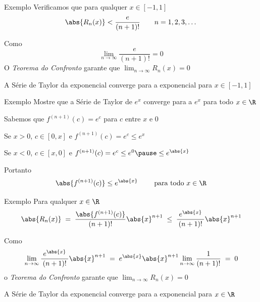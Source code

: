 \documentclass[fleqn,utf8,aspectratio=169,12pt]{beamer}
\begin{document}
\begin{frame}{Exemplo \theexemplo}
  Verificamos que para qualquer \(x\in[-1, 1]\)
  \[
    \abs{R_n(x)} < \frac{\;e\;}{(n+1)!}
    \qquad
    n = 1, 2, 3, \dots
  \]

  \pause
  Como
  \[
    \lim_{n\to\infty} \frac{\;e\;}{(n+1)!} = 0
  \]
  \pause
  O \emph{Teorema do Confronto} garante que
  \(
    \lim_{n\to\infty} R_n(x) = 0
  \)

  \pause
  A Série de Taylor da exponencial converge para a exponencial para \(x\in[-1, 1]\)
\end{frame}

\addtocounter{exemplo}{1}
\begin{frame}{Exemplo \theexemplo}
  Mostre que a Série de Taylor de \(e^x\) converge para a \(e^x\) para todo
  \(x\in\R\)

  \pause
  \vspace{\baselineskip}
  Sabemos que
  \(
    f^{(n+1)}(c) = e^c
  \)
  para \(c\) entre \(x\) e \(0\)

  \pause
  \vspace{\baselineskip}
  Se \(x>0\), \(c\in[0, x]\)
  \pause
  e \;
  \(
    f^{(n+1)}(c) = e^c \leq e^x
  \)

  \pause
  \vspace{0.5\baselineskip}
  Se \(x<0\), \(c\in[x, 0]\)
  \pause
  e \;
  \(
    f^{(n+1)}(c) = e^c \leq e^0
    \pause
    \leq e^{\abs{x}}
  \)

  \pause
  \vspace{0.5\baselineskip}
  Portanto
  \[
    \abs{f^{(n+1)}(c)} \leq e^{\abs{x}}
    \qquad
    \text{ para todo } x \in \R
  \]
\end{frame}

\begin{frame}{Exemplo \theexemplo}
  Para qualquer \(x\in\R\)
  \[
    \abs{R_n(x)}
    \;=\;    \frac{\abs{f^{(n+1)}(c)}}{(n+1)!}\abs{x}^{n+1}
    \;\leq\; \frac{\;e^{\abs{x}}\;}{(n+1)!}\abs{x}^{n+1}
  \]

  \pause
  Como
  \[
    \lim_{n\to\infty} \frac{\;e^{\abs{x}}\;}{(n+1)!}\abs{x}^{n+1}
    \;=\; e^{\abs{x}} \abs{x}^{n+1} \lim_{n\to\infty} \frac{1}{(n+1)!}
    \;=\; 0
  \]
  \pause
  o \emph{Teorema do Confronto} garante que
  \(
    \lim_{n\to\infty} R_n(x) = 0
  \)

  \pause
  A Série de Taylor da exponencial converge para a exponencial para \(x\in\R\)
\end{frame}
\end{document}
